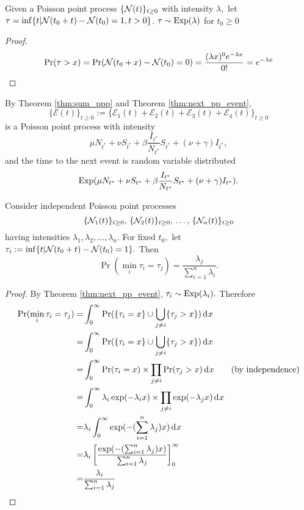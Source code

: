 \begin{theorem}
    \label{thm:next_pp_event}
    Given a Poisson point process $\{\mathcal{N}(t)\}_{t\geq 0}$ with intensity
    $\lambda,$ let $\tau = \inf\{t | \mathcal{N}(t_0 + t) - \mathcal{N}(t_0) = 1, t > 0\}$.
    $\tau \sim \operatorname{Exp}(\lambda)$ for $t_0 \geq 0$
\end{theorem}

\begin{proof}
    $$\Pr(\tau > x) = \Pr(\mathcal{N}(t_0 + x) - \mathcal{N}(t_0) = 0)
        = \frac{(\lambda x)^0e^{-\lambda x}}{0!} = e^{-\lambda x}$$
\end{proof}

By Theorem \ref{thm:sum_ppp} and Theorem \ref{thm:next_pp_event},
$$\{\mathcal{E}(t)\}_{t\geq 0}:=\{\mathcal{E}_1(t) + \mathcal{E}_2(t)
    + \mathcal{E}_3(t) + \mathcal{E}_4(t)\}_{t\geq 0}$$
is a Poisson point process with intensity
$$\mu N_{t^*} + \nu S_{t^*} + \beta \frac{I_{t^*}}{N_{t^*}} S_{t^*}
    + (\nu + \gamma) I_{t^*},$$
and the time to the next event is random variable distributed
$$\operatorname{Exp}(\mu N_{t^*} + \nu S_{t^*}
    + \beta \frac{I_{t^*}}{N_{t^*}} S_{t^*} + (\nu + \gamma) I_{t^*}).$$

\begin{theorem}\label{thm:which_ppp}
    Consider independent Poisson point processes
    $$\{\mathcal{N}_1(t)\}_{t\geq0},\, \{\mathcal{N}_2(t)\}_{t\geq0},\, \dots,\,
        \{\mathcal{N}_n(t)\}_{t\geq0}$$
    having intensities $\lambda_1, \lambda_2, \dots, \lambda_n.$ For fixed
    $t_0,$ let $\tau_i:=\inf\{t | \mathcal{N}(t_0 + t) - \mathcal{N}(t_0) = 1\}.$
    Then
    $$\Pr(\min_i{\tau_i} = \tau_j)
        = \frac{\lambda_j}{\sum_{i = 1}^n \lambda_i}.$$
\end{theorem}
\begin{proof}
    By Theorem \ref{thm:next_pp_event}, $\tau_i \sim \operatorname{Exp}(\lambda_i).$
    Therefore \begin{align*}
        \Pr(\min_i{\tau_i} = \tau_j) = & \int_0^\infty \Pr(\{\tau_i = x\} \cup \bigcup_{j\neq i}\{\tau_j > x\}) \diff x                    \\
        =                              & \int_0^\infty \Pr(\{\tau_i = x\} \cup \bigcup_{j\neq i}\{\tau_j > x\}) \diff x                    \\
        =                              & \int_0^\infty \Pr(\tau_i = x)\times \prod_{j\neq i}\Pr(\tau_j > x) \diff x\tag{by independence}   \\
        =                              & \int_0^\infty \lambda_i\exp(-\lambda_i x) \times \prod_{j\neq i}\exp(-\lambda_j x) \diff x        \\
        =                              & \lambda_i\int_0^\infty \exp(-(\sum_{i = 1}^n\lambda_j) x) \diff x                                 \\
        =                              & \lambda_i\left[\frac{\exp(-(\sum_{i = 1}^n\lambda_j) x)}{\sum_{i = 1}^n\lambda_j}\right]_0^\infty \\
        =                              & \frac{\lambda_i}{\sum_{i = 1}^n\lambda_j}
    \end{align*}
\end{proof}

